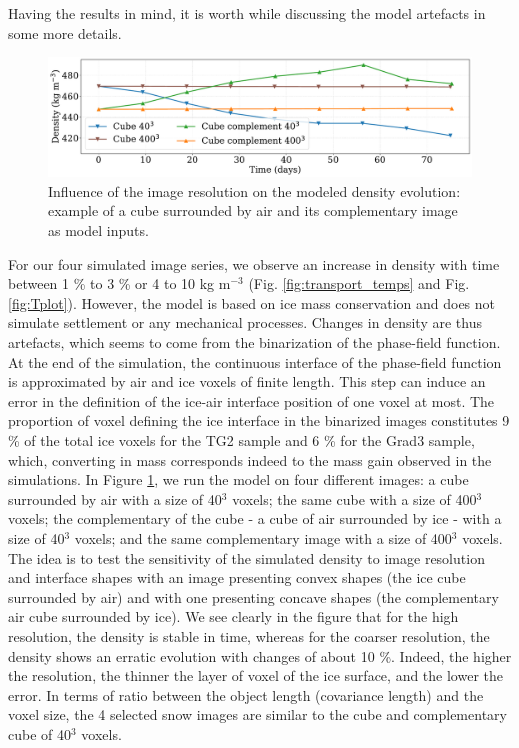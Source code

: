 \documentclass[draft,ms]{agujournal2019}
\begin{document}
Having the results in mind, it is worth while discussing the model artefacts in some more details. 
\begin{figure}
    \centering
    \includegraphics[width=0.9\linewidth]{Figures/cubes_compl_density_propre.pdf}
    \caption{Influence of the image resolution on the modeled density evolution: example of a cube surrounded by air and its complementary image as model inputs.}
    \label{fig:cubes}
\end{figure}
For our four simulated image series, we observe an increase in density with time between 1 \% to 3 \% or 4 to 10 kg m$^{-3}$ (Fig. \ref{fig:transport_temps} and Fig. \ref{fig:Tplot}). However, the model is based on ice mass conservation and does not simulate settlement or any mechanical processes. Changes in density are thus artefacts, which seems to come from the binarization of the phase-field function. At the end of the simulation, the continuous interface of the phase-field function is approximated by air and ice voxels of finite length. This step can induce an error in the definition of the ice-air interface position of one voxel at most. The proportion of voxel defining the ice interface in the binarized images constitutes 9 \% of the total ice voxels for the TG2 sample and 6 \% for the Grad3 sample, which, converting in mass corresponds indeed to the mass gain observed in the simulations. In Figure \ref{fig:cubes}, we run the model on four different images: a cube surrounded by air with a size of 40$^3$ voxels; the same cube with a size of 400$^3$ voxels; the complementary of the cube - a cube of air surrounded by ice - with a size of 40$^3$ voxels; and the same complementary image with a size of 400$^3$ voxels. The idea is to test the sensitivity of the simulated density to image resolution and interface shapes with an image presenting convex shapes (the ice cube surrounded by air) and with one presenting concave shapes (the complementary air cube surrounded by ice). We see clearly in the figure that for the high resolution, the density is stable in time, whereas for the coarser resolution, the density shows an erratic evolution with changes of about 10 \%. Indeed, the higher the resolution, the thinner the layer of voxel of the ice surface, and the lower the error. In terms of ratio between the object length (covariance length) and the voxel size, the 4 selected snow images are similar to the cube and complementary cube of 40$^3$ voxels. %
\end{document}
